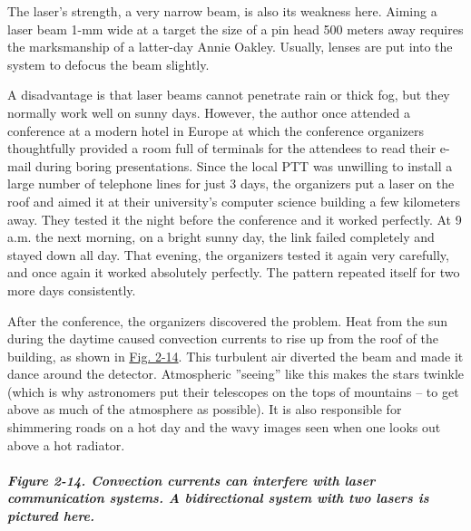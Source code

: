 \documentclass[b5paper,11pt]{memoir}
\begin{document}
The laser's strength, a very narrow beam, is also its weakness here.
Aiming a laser beam 1-mm wide at a target the size of a pin head 500
meters away requires the marksmanship of a latter-day Annie Oakley.
Usually, lenses are put into the system to defocus the beam slightly.

A disadvantage is that laser beams cannot penetrate rain or thick fog,
but they normally work well on sunny days. However, the author once
attended a conference at a modern hotel in Europe at which the
conference organizers thoughtfully provided a room full of terminals for
the attendees to read their e-mail during boring presentations. Since
the local PTT was unwilling to install a large number of telephone lines
for just 3 days, the organizers put a laser on the roof and aimed it at
their university's computer science building a few kilometers away. They
tested it the night before the conference and it worked perfectly. At 9
a.m. the next morning, on a bright sunny day, the link failed completely
and stayed down all day. That evening, the organizers tested it again
very carefully, and once again it worked absolutely perfectly. The
pattern repeated itself for two more days consistently.

After the conference, the organizers discovered the problem. Heat from
the sun during the daytime caused convection currents to rise up from
the roof of the building, as shown in
\protect\hyperlink{0130661023_ch02lev1sec3.htmlux5cux23ch02fig14}{Fig.
2-14}. This turbulent air diverted the beam and made it dance around the
detector. Atmospheric ''seeing'' like this makes the stars twinkle
(which is why astronomers put their telescopes on the tops of
mountains -- to get above as much of the atmosphere as possible). It is
also responsible for shimmering roads on a hot day and the wavy images
seen when one looks out above a hot radiator.

\subparagraph[Figure 2-14. Convection currents can interfere with laser
communication systems. A bidirectional system with two lasers is
pictured
here.]{\texorpdfstring{\protect\hypertarget{0130661023_ch02lev1sec3.htmlux5cux23ch02fig14}{}{}Figure
2-14. Convection currents can interfere with laser communication
systems. A bidirectional system with two lasers is pictured
here.}{Figure 2-14. Convection currents can interfere with laser communication systems. A bidirectional system with two lasers is pictured here.}}


\protect\hypertarget{0130661023_ch02lev1sec4.html}{}{}
\end{document}
